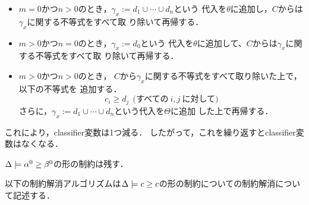 \begin{description}
  \begin{itemize}
  \item $m=0$かつ$n>0$のとき，$\gamma_x:=d_1 \cup \cdots \cup d_n$という
    代入を$\theta$に追加し，$C$からは$\gamma_x$に関する不等式をすべて取
    り除いて再帰する．
  \item $m>0$かつ$n=0$のとき，$\gamma_x:=d_0$という
    代入を$\theta$に追加して、$C$からは$\gamma_x$に関する不等式をすべて取
    り除いて再帰する．
  \item $m>0$かつ$n>0$のとき，
    $C$から$\gamma_x$に関する不等式をすべて取り除いた上で，以下の不等式を
    追加する．
    \[
      c_i \ge d_j   ~~\textrm{(すべての}~i,j~\textrm{に対して)}
    \]
    さらに，$\gamma_x:=d_1 \cup \cdots \cup d_n$という代入を$\Theta$に追加
    した上で再帰する．
  \end{itemize}


  これにより，classifier変数は1つ減る．%
  したがって，これを繰り返すとclassifier変数はなくなる．

\end{description}

$\Delta \models {\alpha^0} \ge {\beta^0}$の形の制約は残す．



以下の制約解消アルゴリズムは$\Delta \models {c} \ge {c}$の形の制約についての制約解消について記述する．

